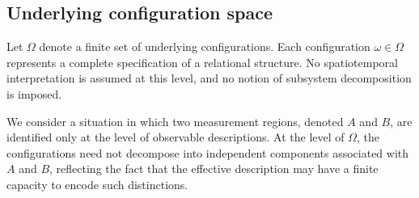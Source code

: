 \subsection{Underlying configuration space}
  \label{subsec:underlying-configuration-space}

  Let $\Omega$ denote a finite set of underlying configurations.
  Each configuration $\omega \in \Omega$ represents a complete specification of a relational structure.
  No spatiotemporal interpretation is assumed at this level, and no notion of
  subsystem decomposition is imposed.

  We consider a situation in which two measurement regions, denoted $A$ and $B$, are
  identified only at the level of observable descriptions.
  At the level of $\Omega$, the configurations need not decompose into independent
  components associated with $A$ and $B$, reflecting the fact that the effective
  description may have a finite capacity to encode such distinctions.
